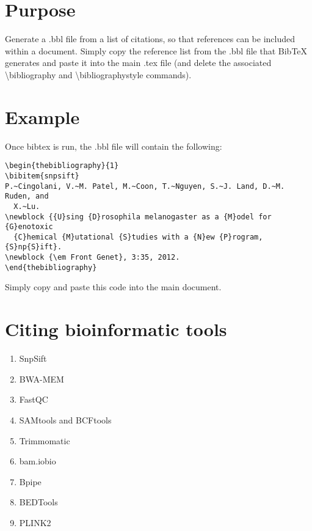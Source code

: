 \documentclass[a4paper, 10pt]{article}
\begin{document}


\section{Purpose}

Generate a .bbl file from a list of citations, so that references can be included within a document. Simply copy the reference list from the .bbl file that BibTeX generates and paste it into the main .tex file (and delete the associated \textbackslash{}bibliography and \textbackslash{}bibliographystyle commands).

\section{Example}

Once bibtex is run, the .bbl file will contain the following:

\begin{lstlisting}
\begin{thebibliography}{1}
\bibitem{snpsift}
P.~Cingolani, V.~M. Patel, M.~Coon, T.~Nguyen, S.~J. Land, D.~M. Ruden, and
  X.~Lu.
\newblock {{U}sing {D}rosophila melanogaster as a {M}odel for {G}enotoxic
  {C}hemical {M}utational {S}tudies with a {N}ew {P}rogram, {S}np{S}ift}.
\newblock {\em Front Genet}, 3:35, 2012.
\end{thebibliography}
\end{lstlisting}

Simply copy and paste this code into the main document.

\section{Citing bioinformatic tools}

\begin{enumerate}

   \item SnpSift\cite{snpsift}
   \item BWA-MEM\cite{bwamem}
   \item FastQC\cite{fastqc}
   \item SAMtools and BCFtools\cite{samtools}
   \item Trimmomatic\cite{trimmomatic}
   \item bam.iobio\cite{bamiobio}
   \item Bpipe\cite{bpipe}
   \item BEDTools\cite{bedtools}
   \item PLINK2\cite{plink2}

\end{enumerate}
\end{document}
